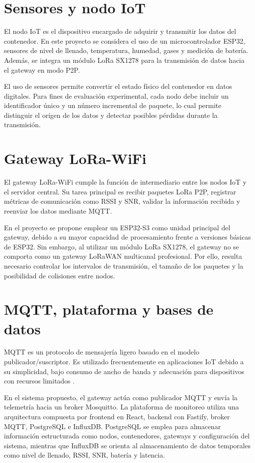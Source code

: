 \section{Sensores y nodo IoT}

El nodo IoT es el dispositivo encargado de adquirir y transmitir los datos del contenedor. En este proyecto se considera el uso de un microcontrolador ESP32, sensores de nivel de llenado, temperatura, humedad, gases y medición de batería. Además, se integra un módulo LoRa SX1278 para la transmisión de datos hacia el gateway en modo P2P.

El uso de sensores permite convertir el estado físico del contenedor en datos digitales. Para fines de evaluación experimental, cada nodo debe incluir un identificador único y un número incremental de paquete, lo cual permite distinguir el origen de los datos y detectar posibles pérdidas durante la transmisión.

\section{Gateway LoRa-WiFi}

El gateway LoRa-WiFi cumple la función de intermediario entre los nodos IoT y el servidor central. Su tarea principal es recibir paquetes LoRa P2P, registrar métricas de comunicación como RSSI y SNR, validar la información recibida y reenviar los datos mediante MQTT.

En el proyecto se propone emplear un ESP32-S3 como unidad principal del gateway, debido a su mayor capacidad de procesamiento frente a versiones básicas de ESP32. Sin embargo, al utilizar un módulo LoRa SX1278, el gateway no se comporta como un gateway LoRaWAN multicanal profesional. Por ello, resulta necesario controlar los intervalos de transmisión, el tamaño de los paquetes y la posibilidad de colisiones entre nodos.

\section{MQTT, plataforma y bases de datos}

MQTT es un protocolo de mensajería ligero basado en el modelo publicador/suscriptor. Es utilizado frecuentemente en aplicaciones IoT debido a su simplicidad, bajo consumo de ancho de banda y adecuación para dispositivos con recursos limitados \cite{oasis2019mqtt}.

En el sistema propuesto, el gateway actúa como publicador MQTT y envía la telemetría hacia un broker Mosquitto. La plataforma de monitoreo utiliza una arquitectura compuesta por frontend en React, backend con Fastify, broker MQTT, PostgreSQL e InfluxDB. PostgreSQL se emplea para almacenar información estructurada como nodos, contenedores, gateways y configuración del sistema, mientras que InfluxDB se orienta al almacenamiento de datos temporales como nivel de llenado, RSSI, SNR, batería y latencia.


